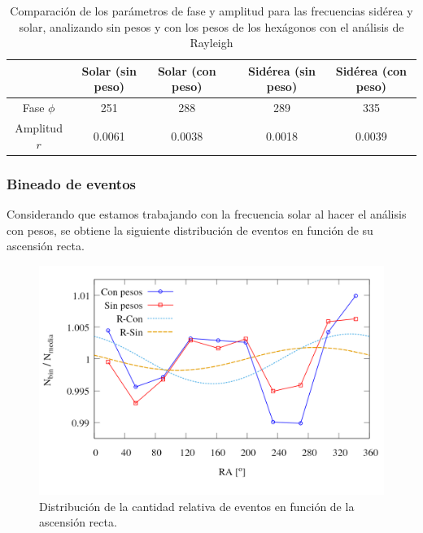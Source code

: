 		
		\begin{table}[H]
		\centering
		\begin{tabular}{c|c|c|c|c|c}
					& Solar (sin peso)	& Solar (con peso)	&& Sidérea (sin peso) 	& Sidérea (con peso)	 \\ \hline
		Fase $\phi$ & 251	    		& 288	    		&& 289				& 335				\\
		Amplitud $r$& 0.0061	    	& 0.0038	  		&&0.0018		& 0.0039			\\
		\end{tabular}
		\caption{Comparación de los parámetros de fase y amplitud para las frecuencias sidérea y solar, analizando sin pesos y con los pesos de los hexágonos con el análisis de Rayleigh}
		\end{table}


\subsubsection{Bineado de eventos }


Considerando que estamos trabajando con la frecuencia solar al hacer el análisis con pesos, se obtiene la siguiente distribución de eventos en función de su ascensión recta.
\begin{figure}[H]
	\centering
	\includegraphics[width=\linewidth]{eventos_clasificados_por_RA_v3.png}
	\caption{Distribución de la cantidad relativa de eventos en función de la ascensión recta.}
\end{figure}

		

